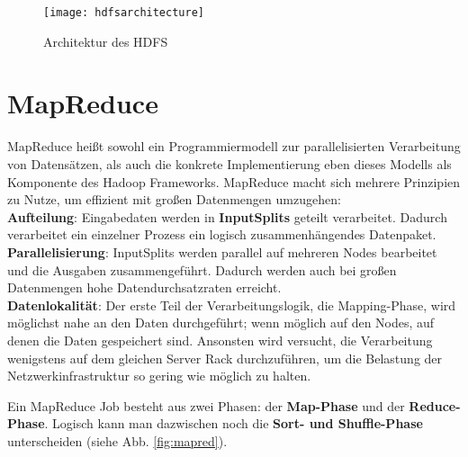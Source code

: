 \begin{figure}[ht]
    \centering
    \texttt{[image: hdfsarchitecture]}
    \caption[Architektur des HDFS]{Architektur des HDFS\parencite[S.69, Figure 3-2]{white_hadoop_2015}}
    \label{fig:hdfs}
\end{figure}

\section{MapReduce}
\label{chap:fund sec:core sub:mapred}
MapReduce heißt sowohl ein Programmiermodell zur parallelisierten Verarbeitung von Datensätzen, als auch die konkrete Implementierung eben dieses Modells als Komponente des Hadoop Frameworks. MapReduce macht sich mehrere Prinzipien zu Nutze, um effizient mit großen Datenmengen umzugehen\cite{freiknecht_big_2018}: \\
\textbf{Aufteilung}: Eingabedaten werden in \textbf{InputSplits} geteilt verarbeitet. Dadurch verarbeitet ein einzelner Prozess ein logisch zusammenhängendes Datenpaket.\\
\textbf{Parallelisierung}: InputSplits werden parallel auf mehreren Nodes bearbeitet und die Ausgaben zusammengeführt. Dadurch werden auch bei großen Datenmengen hohe Datendurchsatzraten erreicht.\\
\textbf{Datenlokalität}: Der erste Teil der Verarbeitungslogik, die Mapping-Phase, wird möglichst nahe an den Daten durchgeführt; wenn möglich auf den Nodes, auf denen die Daten gespeichert sind. Ansonsten wird versucht, die Verarbeitung wenigstens auf dem gleichen Server Rack durchzuführen, um die Belastung der Netzwerkinfrastruktur so gering wie möglich zu halten.
\par
Ein MapReduce Job besteht aus zwei Phasen: der \textbf{Map-Phase} und der \textbf{Reduce-Phase}. Logisch kann man dazwischen noch die \textbf{Sort- und Shuffle-Phase} unterscheiden (siehe Abb. \ref*{fig:mapred}).

